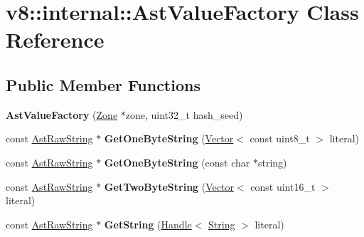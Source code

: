 \hypertarget{classv8_1_1internal_1_1_ast_value_factory}{}\section{v8\+:\+:internal\+:\+:Ast\+Value\+Factory Class Reference}
\label{classv8_1_1internal_1_1_ast_value_factory}
\subsection*{Public Member Functions}
\begin{DoxyCompactItemize}
\item 
\hypertarget{classv8_1_1internal_1_1_ast_value_factory_a70127bc521314ac55105a1725819c8c1}{}{\bfseries Ast\+Value\+Factory} (\hyperlink{classv8_1_1internal_1_1_zone}{Zone} $\ast$zone, uint32\+\_\+t hash\+\_\+seed)\label{classv8_1_1internal_1_1_ast_value_factory_a70127bc521314ac55105a1725819c8c1}

\item 
\hypertarget{classv8_1_1internal_1_1_ast_value_factory_a8b185da53432ca85bb3b6d46556c0d75}{}const \hyperlink{classv8_1_1internal_1_1_ast_raw_string}{Ast\+Raw\+String} $\ast$ {\bfseries Get\+One\+Byte\+String} (\hyperlink{classv8_1_1internal_1_1_vector}{Vector}$<$ const uint8\+\_\+t $>$ literal)\label{classv8_1_1internal_1_1_ast_value_factory_a8b185da53432ca85bb3b6d46556c0d75}

\item 
\hypertarget{classv8_1_1internal_1_1_ast_value_factory_a4de86ce5c6002dec8cd8e441a36871ac}{}const \hyperlink{classv8_1_1internal_1_1_ast_raw_string}{Ast\+Raw\+String} $\ast$ {\bfseries Get\+One\+Byte\+String} (const char $\ast$string)\label{classv8_1_1internal_1_1_ast_value_factory_a4de86ce5c6002dec8cd8e441a36871ac}

\item 
\hypertarget{classv8_1_1internal_1_1_ast_value_factory_a7de761f4c43839504dbcbbea2950854a}{}const \hyperlink{classv8_1_1internal_1_1_ast_raw_string}{Ast\+Raw\+String} $\ast$ {\bfseries Get\+Two\+Byte\+String} (\hyperlink{classv8_1_1internal_1_1_vector}{Vector}$<$ const uint16\+\_\+t $>$ literal)\label{classv8_1_1internal_1_1_ast_value_factory_a7de761f4c43839504dbcbbea2950854a}

\item 
\hypertarget{classv8_1_1internal_1_1_ast_value_factory_aaf364273b48895f490ec1008ecd29bed}{}const \hyperlink{classv8_1_1internal_1_1_ast_raw_string}{Ast\+Raw\+String} $\ast$ {\bfseries Get\+String} (\hyperlink{classv8_1_1internal_1_1_handle}{Handle}$<$ \hyperlink{classv8_1_1internal_1_1_string}{String} $>$ literal)\label{classv8_1_1internal_1_1_ast_value_factory_aaf364273b48895f490ec1008ecd29bed}


\end{DoxyCompactItemize}

